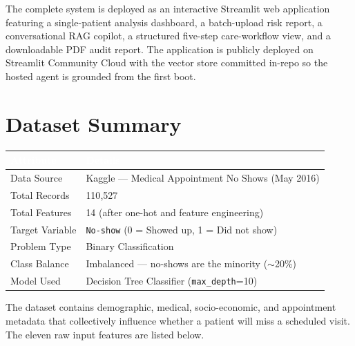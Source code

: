 \documentclass[11pt,a4paper]{article}
\newcommand{\hdrrow}[1]{\textcolor{white}{\textbf{#1}}}
\newcommand{\hdrline}{\rowcolor{navy}}
\begin{document}
The complete system is deployed as an interactive Streamlit web application
featuring a single-patient analysis dashboard, a batch-upload risk report,
a conversational RAG copilot, a structured five-step care-workflow view, and
a downloadable PDF audit report. The application is publicly deployed on
Streamlit Community Cloud with the vector store committed in-repo so the
hosted agent is grounded from the first boot.

\section{Dataset Summary}

\renewcommand{\arraystretch}{1.35}
\begin{tabularx}{\textwidth}{|>{\hsize=0.35\hsize}X|X|}
\hline
\hdrline \hdrrow{Attribute} & \hdrrow{Details} \\ \hline
Data Source        & Kaggle — Medical Appointment No Shows (May 2016) \\ \hline
Total Records      & 110{,}527 \\ \hline
Total Features     & 14 (after one-hot and feature engineering) \\ \hline
Target Variable    & \texttt{No-show} (0 = Showed up, 1 = Did not show) \\ \hline
Problem Type       & Binary Classification \\ \hline
Class Balance      & Imbalanced — no-shows are the minority ($\sim$20\%) \\ \hline
Model Used         & Decision Tree Classifier (\texttt{max\_depth}=10) \\ \hline
\end{tabularx}

\vspace{8pt}
The dataset contains demographic, medical, socio-economic, and appointment
metadata that collectively influence whether a patient will miss a scheduled
visit. The eleven raw input features are listed below.
\end{document}
